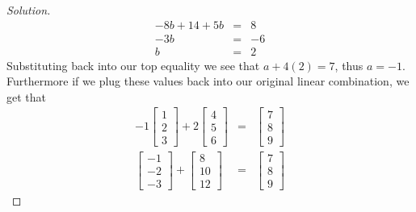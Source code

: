 \documentclass[12pt]{amsart}
\newenvironment{solution}
{\begin{proof}[Solution]}
{\end{proof}}
\begin{document}
\begin{onehalfspace}
\begin{solution}
\begin{eqnarray*}
                -8b + 14 + 5b & = & 8 \\
                -3b & = & -6 \\
                b & = & 2
            \end{eqnarray*}
            Substituting back into our top equality we see that $a + 4(2) = 7$, thus $a = -1$. Furthermore if we plug these
            values back into our original linear combination, we get that
            \begin{eqnarray*}
                -1\left[\begin{matrix}
                           1 \\
                           2 \\
                           3
                \end{matrix}\right] +
                2\left[\begin{matrix}
                           4 \\
                           5 \\
                           6
                \end{matrix}\right] & = &
                \left[\begin{matrix}
                          7 \\
                          8 \\
                          9
                \end{matrix}\right] \\
                \left[\begin{matrix}
                            -1 \\
                            -2 \\
                            -3
                \end{matrix}\right] +
                \left[\begin{matrix}
                           8 \\
                           10 \\
                           12
                \end{matrix}\right] & = &
                \left[\begin{matrix}
                          7 \\
                          8 \\
                          9
                \end{matrix}\right]
            \end{eqnarray*}

\end{solution}
\end{onehalfspace}
\end{document}
